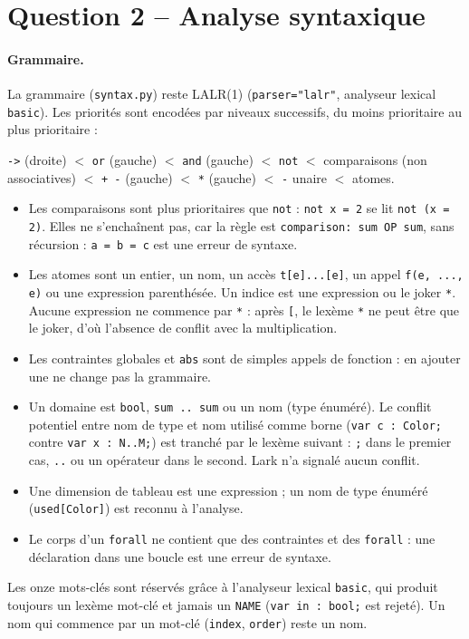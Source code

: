 \documentclass[11pt,a4paper]{article}
\newcommand{\code}[1]{\texttt{#1}}
\begin{document}
\section{Question 2 -- Analyse syntaxique}

\paragraph{Grammaire.} La grammaire (\code{syntax.py}) reste LALR(1)
(\code{parser="lalr"}, analyseur lexical \code{basic}). Les priorités sont encodées par
niveaux successifs, du moins prioritaire au plus prioritaire :
\begin{center}
\code{->} (droite) $<$ \code{or} (gauche) $<$ \code{and} (gauche) $<$ \code{not} $<$
comparaisons (non associatives) $<$ \code{+ -} (gauche) $<$ \code{*} (gauche) $<$
\code{-} unaire $<$ atomes.
\end{center}
\begin{itemize}
  \item Les comparaisons sont plus prioritaires que \code{not} : \code{not x = 2} se lit
        \code{not (x = 2)}. Elles ne s'enchaînent pas, car la règle est
        \code{comparison: sum OP sum}, sans récursion : \code{a = b = c} est une erreur de
        syntaxe.
  \item Les atomes sont un entier, un nom, un accès \code{t[e]...[e]}, un appel
        \code{f(e, ..., e)} ou une expression parenthésée. Un indice est une expression ou le
        joker \code{*}. Aucune expression ne commence par \code{*} : après \code{[}, le
        lexème \code{*} ne peut être que le joker, d'où l'absence de conflit avec la
        multiplication.
  \item Les contraintes globales et \code{abs} sont de simples appels de fonction : en
        ajouter une ne change pas la grammaire.
  \item Un domaine est \code{bool}, \code{sum .. sum} ou un nom (type énuméré). Le conflit
        potentiel entre \og nom de type \fg{} et \og nom utilisé comme borne \fg{}
        (\code{var c : Color;} contre \code{var x : N..M;}) est tranché par le lexème
        suivant : \code{;} dans le premier cas, \code{..} ou un opérateur dans le second.
        Lark n'a signalé aucun conflit.
  \item Une dimension de tableau est une expression ; un nom de type énuméré
        (\code{used[Color]}) est reconnu à l'analyse.
  \item Le corps d'un \code{forall} ne contient que des contraintes et des \code{forall} :
        une déclaration dans une boucle est une erreur de syntaxe.
\end{itemize}
Les onze mots-clés sont réservés grâce à l'analyseur lexical \code{basic}, qui produit
toujours un lexème mot-clé et jamais un \code{NAME} (\code{var in : bool;} est rejeté). Un nom
qui commence par un mot-clé (\code{index}, \code{order}) reste un nom.
\end{document}
